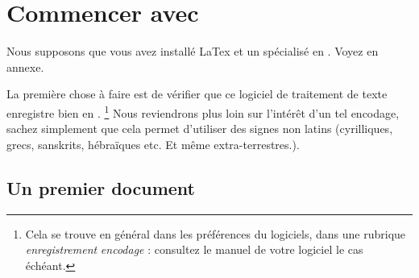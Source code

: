 \chapter{Commencer avec }

\begin{prealable}
Nous supposons que vous avez installé LaTex et un  spécialisé en . Voyez en annexe.

La première chose à faire est de vérifier que ce logiciel de traitement de texte enregistre bien en . \footnote{Cela se trouve en général dans les préférences du logiciels, dans une rubrique \emph{enregistrement} \emph{encodage} : consultez le manuel de votre logiciel le cas échéant.} Nous reviendrons plus loin sur l'intérêt d'un tel encodage, sachez simplement que cela permet d'utiliser des signes non latins (cyrilliques, grecs, sanskrits, hébraïques etc. Et même extra-terrestres.).

\end{prealable}

\section{Un premier document}


